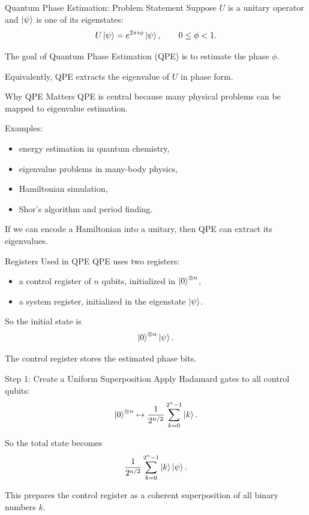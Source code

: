 \documentclass{beamer}
\begin{document}
\begin{frame}{Quantum Phase Estimation: Problem Statement}
Suppose \(U\) is a unitary operator and \(\ket{\psi}\) is one of its eigenstates:
\[
U\ket{\psi}=e^{2\pi i \phi}\ket{\psi},
\qquad 0\le \phi <1.
\]

The goal of Quantum Phase Estimation (QPE) is to estimate the phase \(\phi\).

Equivalently, QPE extracts the eigenvalue of \(U\) in phase form.
\end{frame}

\begin{frame}{Why QPE Matters}
QPE is central because many physical problems can be mapped to eigenvalue estimation.

Examples:
\begin{itemize}
\item energy estimation in quantum chemistry,
\item eigenvalue problems in many-body physics,
\item Hamiltonian simulation,
\item Shor's algorithm and period finding.
\end{itemize}

If we can encode a Hamiltonian into a unitary, then QPE can extract its eigenvalues.
\end{frame}

\begin{frame}{Registers Used in QPE}
QPE uses two registers:

\begin{itemize}
\item a control register of \(n\) qubits, initialized in \(\ket{0}^{\otimes n}\),
\item a system register, initialized in the eigenstate \(\ket{\psi}\).
\end{itemize}

So the initial state is
\[
\ket{0}^{\otimes n}\ket{\psi}.
\]

The control register stores the estimated phase bits.
\end{frame}

\begin{frame}{Step 1: Create a Uniform Superposition}
Apply Hadamard gates to all control qubits:
\[
\ket{0}^{\otimes n}
\mapsto
\frac{1}{2^{n/2}}
\sum_{k=0}^{2^n-1}\ket{k}.
\]

So the total state becomes
\[
\frac{1}{2^{n/2}}
\sum_{k=0}^{2^n-1}
\ket{k}\ket{\psi}.
\]

This prepares the control register as a coherent superposition of all binary numbers \(k\).
\end{frame}
\end{document}
